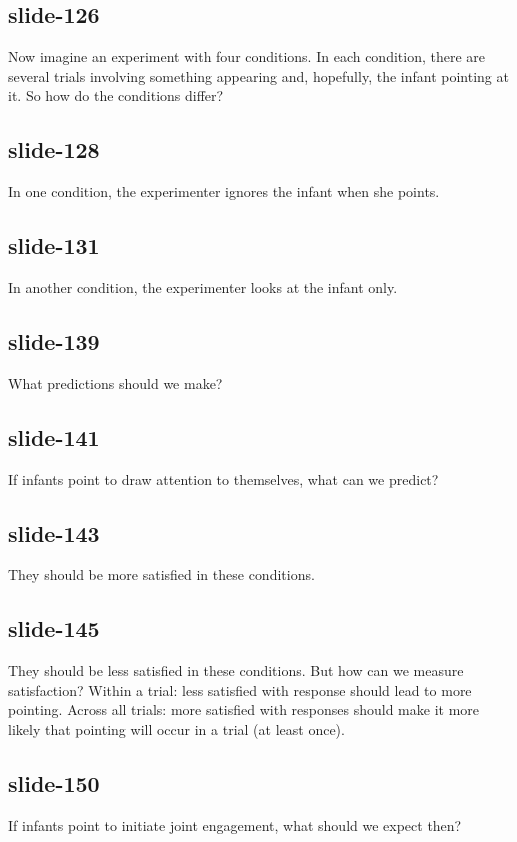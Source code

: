 \documentclass[12pt,\papersize]{extarticle}
\begin{document}
 
\subsection{slide-126}
Now imagine an experiment with four conditions.
In each condition, there are several trials involving something appearing and, hopefully, the infant pointing at it.
So how do the conditions differ?
 
 
\subsection{slide-128}
In one condition, the experimenter ignores the infant when she points.
 
 
\subsection{slide-131}
In another condition, the experimenter looks at the infant only.
 
 
\subsection{slide-139}
What predictions should we make?
 
 
\subsection{slide-141}
If infants point to draw attention to themselves, what can we predict?
 
 
\subsection{slide-143}
They should be more satisfied in these conditions.
 
 
\subsection{slide-145}
They should be less satisfied in these conditions.
But how can we measure satisfaction?
Within a trial: less satisfied with response should lead to more pointing.
Across all trials: more satisfied with responses should make it more likely that pointing will occur in a trial (at least once).
 
 
\subsection{slide-150}
If infants point to initiate joint engagement, what should we expect then?
 
\end{document}
